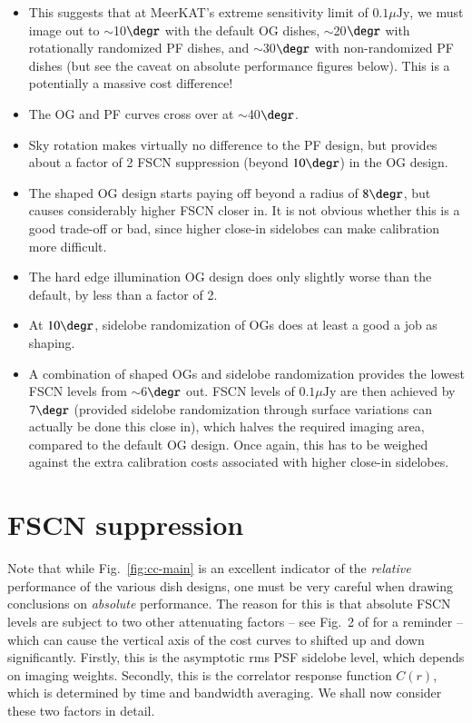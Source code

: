 \documentclass{aa}
\begin{document}
\begin{itemize}
  \item This suggests that at MeerKAT's extreme sensitivity limit of $0.1 \mu\mathrm{Jy}$, we must image out to $\sim$10$\degr$ with the default OG dishes, $\sim$20$\degr$ with rotationally randomized PF dishes, and $\sim$30$\degr$ with non-randomized PF dishes (but see the caveat on absolute performance figures below). This is a potentially a massive cost difference!
  \item The OG and PF curves cross over at $\sim$40$\degr$.
  \item Sky rotation makes virtually no difference to the PF design, but provides about a factor of 2 FSCN suppression (beyond $10\degr$) in the OG design.
  \item The shaped OG design starts paying off beyond a radius of $8\degr$, but causes considerably higher FSCN closer in. It is not obvious whether this is a good trade-off or bad, since higher close-in sidelobes can make calibration more difficult.
  \item The hard edge illumination OG design does only slightly worse than the default, by less than a factor of 2.
  \item At $10\degr$, sidelobe randomization of OGs does at least a good a job as shaping.
  \item A combination of shaped OGs and sidelobe randomization provides the lowest FSCN levels from $\sim$6$\degr$ out.
  FSCN levels of $0.1 \mu\mathrm{Jy}$ are then achieved by $7\degr$ (provided sidelobe randomization through surface variations can actually be done this close in), which halves the required imaging area, compared to the default OG design. Once again, this has to be weighed against the extra calibration costs associated with higher close-in sidelobes.
\end{itemize}

\section{FSCN suppression}

Note that while Fig.~\ref{fig:cc-main} is an excellent indicator of the \emph{relative} performance of the various dish designs, one must be very careful when drawing conclusions on \emph{absolute} performance. The reason for this is that absolute FSCN levels are subject to two other attenuating factors -- see Fig.~2 of \citet{SKA54-expa,SKA54} for a reminder -- which can cause the vertical axis of the cost curves to shifted up and down significantly. Firstly, this is the asymptotic rms PSF sidelobe level, which depends on imaging weights. Secondly, this is the correlator response function $C(r)$, which is determined by time and bandwidth averaging. We shall now consider these two factors in detail.
\end{document}
